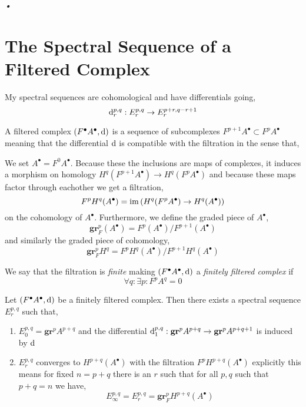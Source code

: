 \textit{•}\documentclass[12pt]{article}
\newcommand{\Da}{\mbox{\usefont{T2A}{\rmdefault}{m}{n}\CYRD}}
\begin{document}
\section{The Spectral Sequence of a Filtered Complex} 

\renewcommand{\gr}{\mathbf{gr}}
\newcommand{\Tot}{\mathrm{Tot}}
\newcommand{\R}{\mathbf{R}}
\newcommand{\Hdr}{\mathcal{H}_{\dR}}
\newcommand{\GM}{\Da}
\newcommand{\ul}[1]{\underline{#1}}
\newcommand{\bH}{\mathbb{H}}

\begin{rmk}
My spectral sequences are cohomological and have differentials going,
\[ \mathrm{d}_r^{p,q} : E_r^{p,q} \to E_r^{p+r, q-r+1} \]
\end{rmk}


\begin{defn}
A filtered complex $(F^\bullet A^\bullet, \mathrm{d})$ is a sequence of subcomplexes $F^{p+1} A^\bullet \subset F^p A^\bullet$ meaning that the differential $\mathrm{d}$ is compatible with the filtration in the sense that,
\begin{center}
\end{center}
We set $A^\bullet = F^0 A^\bullet$. Because these the inclusions are maps of complexes, it induces a morphism on homology $H^q(F^{p+1} A^\bullet) \to H^q(F^{p} A^\bullet)$ and because these maps factor through eachother we get a filtration,
\[ F^p H^q(A^\bullet) = \operatorname{\mathrm{im}}{(H^q(F^p A^\bullet) \to H^q(A^\bullet))} \]
on the cohomology of $A^\bullet$. Furthermore, we define the graded piece of $A^\bullet$,
\[ \gr_F^p(A^\bullet) = F^p(A^\bullet) / F^{p+1}(A^\bullet) \]
and similarly the graded piece of cohomology,
\[ \gr_F^p H^q = F^p H^q(A^\bullet) / F^{p+1} H^q(A^\bullet) \]
\end{defn}

\begin{defn}
We say that the filtration is \textit{finite} making $(F^\bullet A^\bullet, \mathrm{d})$ a \textit{finitely filtered complex} if 
\[ \forall q : \exists p : F^p A^q = 0 \]
\end{defn}

\begin{prop}
Let $(F^\bullet A^\bullet, \mathrm{d})$ be a finitely filtered complex. Then there exists a spectral sequence $E^{p,q}_r$ such that,
\begin{enumerate}
\item $E^{p,q}_0 = \gr^p A^{p+q}$ and the differential $\d_1^{p,q} : \gr^{p} A^{p+q} \to \gr^{p} A^{p+q+1}$ is induced by $\mathrm{d}$ 
\item $E^{p,q}_r$ converges to $H^{p+q}(A^\bullet)$ with the filtration $F^p H^{p+q}(A^\bullet)$ explicitly this means for fixed $n = p+q$ there is an $r$ such that for all $p,q$ such that $p + q = n$ we have,
\[ E^{p,q}_{\infty} = E^{p,q}_r = \gr^p_F H^{p+q}(A^\bullet) \]
\end{enumerate}
\end{prop}
\end{document}
